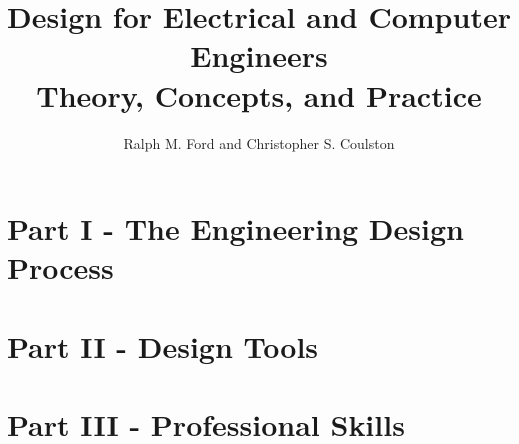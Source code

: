 \documentclass[letterpaper, 10pt]{memoir}
\begin{document}
\frontmatter
\title{{\Huge Design for Electrical and Computer Engineers} \\
				Theory, Concepts, and Practice}
\author{Ralph M. Ford and Christopher S. Coulston}
\date{}
\maketitle



%

\tableofcontents


\mainmatter 					%

\chapter*{Part I - The Engineering Design Process }













\chapter*{Part II - Design Tools}













\chapter*{Part III - Professional Skills}






\end{document}
